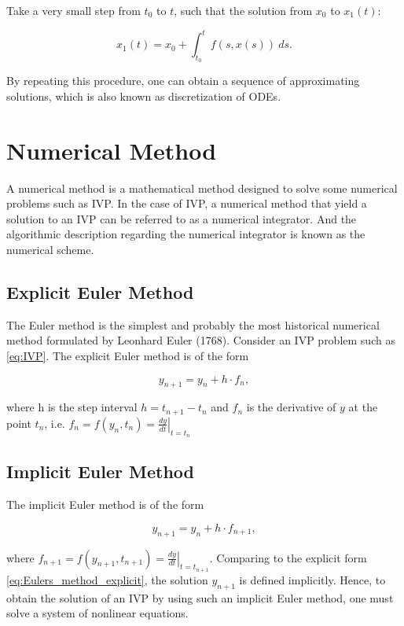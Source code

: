 \documentclass[
	parskip, 			   %
	twoside, 			   %
	DIV=14, 			   %
	BCOR=15.0mm, 		   %
	headsepline, 		   %
	open=right, 		   %
	captions=tableheading, %
	bibliography=totoc,    %
	numbers=noenddot       %
]{scrreprt}
\begin{document}
Take a very small step from $t_{0}$ to $t$, such that the solution from $x_{0}$ to $x_{1}(t)$:

\begin{equation}
    \label{eq:solution_IVP_first_step}
    x_{1}(t) = x_{0} + \int_{t_{0}}^{t} f(s, x(s))\:ds.
\end{equation}

By repeating this procedure, one can obtain a sequence of approximating solutions, which is also known as discretization of ODEs.

\clearpage
\section{Numerical Method}
A numerical method is a mathematical method designed to solve some numerical problems such as IVP. In the case of IVP, a numerical method that yield a solution to an IVP can be referred to as a numerical integrator. And the algorithmic description regarding the numerical integrator is known as the numerical scheme.
\subsection{Explicit Euler Method}
The Euler method is the simplest and probably the most historical numerical method formulated by Leonhard Euler (1768). Consider an IVP problem such as \ref{eq:IVP}. The explicit Euler method is of the form

\begin{equation}
    \label{eq:Eulers_method_explicit}
    y_{n+1} = y_{n} + h \cdot f_{n},
\end{equation}

where h is the step interval $h = t_{n+1} - t_{n}$ and $f_{n}$ is the derivative of $y$ at the point $t_{n}$, i.e. $f_{n} = f(y_n, t_n) = \left. \frac{dy}{dt} \right|_{t=t_n}$

\subsection{Implicit Euler Method}
The implicit Euler method is of the form

\begin{equation}
    \label{eq:Eulers_method_implicit}
    y_{n+1} = y_{n} + h \cdot f_{n+1},
\end{equation}

where $f_{n+1} = f(y_{n+1}, t_{n+1}) = \left. \frac{dy}{dt} \right|_{t=t_{n+1}}$. Comparing to the explicit form \ref{eq:Eulers_method_explicit}, the solution $y_{n+1}$ is defined implicitly. Hence, to obtain the solution of an IVP by using such an implicit Euler method, one must solve a system of nonlinear equations.
\end{document}

